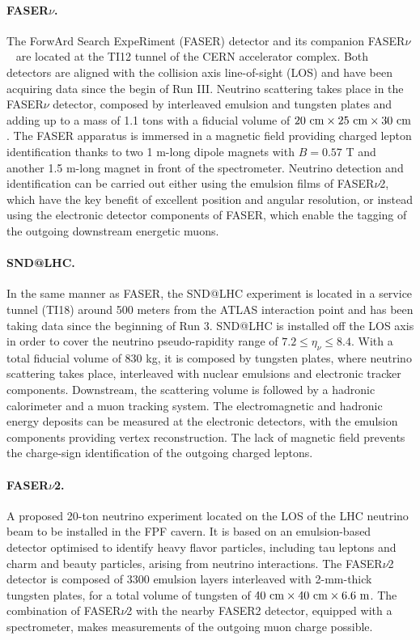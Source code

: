 \paragraph{FASER$\nu$.}
%
The ForwArd Search ExpeRiment (FASER) detector and its companion FASER$\nu$~\cite{FASER:2019aik,FASER:2019dxq}
are located at the TI12 tunnel of the CERN accelerator complex.
%
Both detectors are aligned
with the collision axis line-of-sight (LOS)
and have been acquiring data since the begin of Run III.
%
Neutrino scattering takes place in the FASER$\nu$
detector, composed by interleaved emulsion and tungsten plates and
adding up to a mass of 1.1 tons with a fiducial volume of $20~\rm{cm} \times 25~\rm{cm} \times 30~{\rm cm}$.
%
The FASER apparatus is immersed in a magnetic field  providing charged lepton
identification thanks to two 1 m-long dipole magnets with $B=0.57$ T
and another 1.5 m-long magnet in front of the spectrometer. 
%
Neutrino detection and identification can be carried out either using the emulsion
films of FASER$\nu$2, which have the key benefit of excellent position and angular resolution,
or instead using the electronic detector components of FASER, which enable the tagging
of the outgoing downstream energetic muons.

\paragraph{SND@LHC.}
%
In the same manner as FASER, the SND@LHC experiment is located in a service tunnel (TI18)
around 500 meters from the ATLAS interaction point and has been taking data
since the  beginning of Run 3.
%
SND@LHC is installed off the LOS axis in order to cover the neutrino
pseudo-rapidity range of $7.2 \le \eta_\nu \le 8.4$.
%
With a total fiducial volume of 830 kg, it is composed by tungsten plates,
where neutrino scattering takes place, interleaved with nuclear emulsions and electronic tracker
components.
%
Downstream, the scattering volume is followed by a hadronic calorimeter and a muon tracking system.
%
The electromagnetic
 and hadronic energy deposits can be measured at the electronic detectors, with the emulsion
 components providing vertex reconstruction.
 The lack of magnetic field prevents the charge-sign identification of the outgoing charged leptons.

\paragraph{FASER$\nu$2.}
%
A proposed 20-ton neutrino experiment located on the LOS
of the LHC neutrino beam to be installed in the FPF cavern.
%
It is based on an emulsion-based detector optimised to identify heavy flavor particles, including
tau leptons and charm and beauty particles, arising from neutrino interactions.
%
The FASER$\nu$2 detector is composed of 3300 emulsion layers interleaved with 2-mm-thick tungsten plates,
for a total volume of  tungsten of $40~\rm{cm} \times 40~\rm{cm} \times 6.6~{\rm m}$.
%
The combination of FASER$\nu$2  with the nearby FASER2 detector, equipped with a spectrometer, makes measurements of the outgoing muon charge possible.

